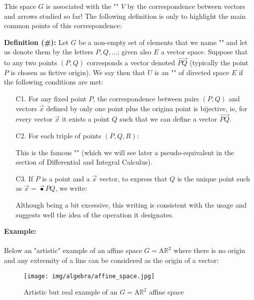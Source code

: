 	This space $G$ is associated with the "" $V$ by the correspondence between vectors and arrows studied so far! The following definition is only to highlight the main common points of this correspondence:
	
	\textbf{Definition (\#\mydef):} Let $G$ be a non-empty set of elements that we name "" and let us  denote them by the letters $P, Q, ...$; given also $E$ a vector space. Suppose that to any two points $(P, Q)$ corresponds a vector denoted $\overrightarrow{PQ}$ (typically the point $P$ is chosen as fictive origin). We say then that $U$ is an "" of directed space $E$ if the following conditions are met:
	\begin{enumerate}
		\item[C1.] For any fixed point $P$, the correspondence between pairs $(P, Q)$ and vectors $\vec{x}$ defined by only one point plus the origina point is bijective, ie, for every vector $\vec{x}$ it exists a point $Q$ such that we can define a vector $\overrightarrow{PQ}$.
		
		\item[C2.] For each triple of points $(P, Q, R)$:
		
		This is the famous "" (which we will see later a pseudo-equivalent in the section of Differential and Integral Calculus).
		
		\item[C3.] If $P$ is a point and a $\vec{x}$ vector, to express that $Q$ is the unique point such as $\vec{x}=\overrightarrow{•}{PQ}$, we write:
		
		Although being a bit excessive, this writing is consistent with the usage and suggests well the idea of the operation it designates.
	\end{enumerate}
	\begin{tcolorbox}[colframe=black,colback=white,sharp corners]
	\textbf{{\Large {}}Example:}\\\\
	Below an "artistic" example of an affine space $G=\text{A}\mathbb{R}^2$ where there is no origin and any extremity of a line can be considered as the origin of a vector:
	\begin{figure}[H]
		\centering
		\texttt{[image: img/algebra/affine\_space.jpg]}
		\caption{Artistic but real example of an $G=\text{A}\mathbb{R}^2$ affine space}
	\end{figure}
	\end{tcolorbox}
	
